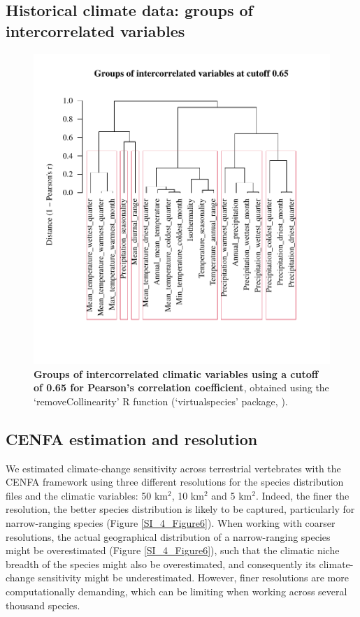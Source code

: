\documentclass[11pt]{article}
\begin{document}
\subsection{Historical climate data: groups of intercorrelated variables}
\begin{figure}[h!]
\centering
\includegraphics[scale=0.9, trim={0 1.75cm 0 2cm},clip]{Figures/ClimVars_groups2}
\caption[Groups of intercorrelated climatic variables using a cutoff of 0.65 for Pearson's correlation coefficient]{\textbf{Groups of intercorrelated climatic variables using a cutoff of 0.65 for Pearson's correlation coefficient}, obtained using the `removeCollinearity' R function (`virtualspecies' package, \citet{virtualspecies}).}
\label{SI_4_Figure5}
\end{figure}


\subsection{CENFA estimation and resolution}
We estimated climate-change sensitivity across terrestrial vertebrates with the CENFA framework using three different resolutions for the species distribution files and the climatic variables: 50 km$^2$, 10 km$^2$ and 5 km$^2$. Indeed, the finer the resolution, the better species distribution is likely to be captured, particularly for narrow-ranging species (Figure \ref{SI_4_Figure6}). When working with coarser resolutions, the actual geographical distribution of a narrow-ranging species might be overestimated (Figure \ref{SI_4_Figure6}), such that the climatic niche breadth of the species might also be overestimated, and consequently its climate-change sensitivity might be underestimated. However, finer resolutions are more computationally demanding, which can be limiting when working across several thousand species. 
\end{document}
